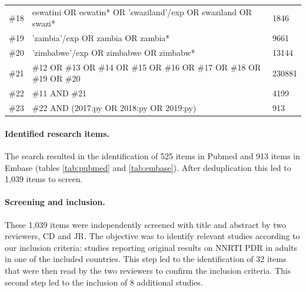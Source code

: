 \documentclass{article}
\begin{document}
\begin{table}[h]
\begin{tabular}{lp{12cm}l}
			\#18 & eswatini OR eswatin* OR 'swaziland'/exp OR swaziland OR swazi*       & 1846 \\
			\#19 & 'zambia'/exp OR zambia OR zambia*       & 9661 \\
			\#20 & 'zimbabwe'/exp OR zimbabwe OR zimbabw*        & 13144 \\
			\#21 & \#12 OR \#13 OR \#14 OR \#15 OR \#16 OR \#17 OR \#18 OR \#19 OR \#20      & 230881 \\
			\#22 & \#11 AND \#21         & 4199 \\
			\#23 & \#22 AND (2017:py OR 2018:py OR 2019:py)        & 913 \\
			\hline
		\end{tabular}
	\end{table}
	
	\paragraph{Identified research items.} The search resulted in the identification of 525 items in Pubmed and 913 items in Embase (tables \ref{tab:pubmed} and \ref{tab:embase}). After deduplication this led to 1,039 items to screen.
	
	
	\paragraph{Screening and inclusion.} These 1,039 items were independently screened with title and abstract by two reviewers, CD and JR.
	The objective was to identify relevant studies according to our inclusion criteria: studies reporting original results on NNRTI PDR in adults in one of the included countries. This step led to the identification of 32 items that were then read by the two reviewers to confirm the inclusion criteria. This second step led to the inclusion of 8 additional studies. 
	
\end{document}
